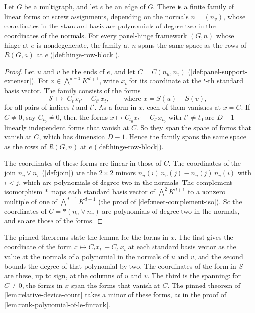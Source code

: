 \begin{lemma}
  \label{lem:rows-polynomial-in-normals}
  \leanok
  Let $G$ be a multigraph, and let $e$ be an edge of $G$. There is a
  finite family of linear forms on screw assignments, depending on the
  normals $n = (n_v)$, whose coordinates in the standard basis are
  polynomials of degree two in the coordinates of the normals. For every
  panel-hinge framework $(G, n)$ whose hinge at $e$ is nondegenerate, the
  family at $n$ spans the same space as the rows of $R(G,n)$ at $e$
  (\cref{def:hinge-row-block}).
\end{lemma}
\begin{proof}
  \leanok
  Let $u$ and $v$ be the ends of $e$, and let $C = C(n_u, n_v)$
  (\cref{def:panel-support-extensor}). For $x \in \bigwedge^{d-1} K^{d+1}$,
  write $x_t$ for its coordinate at the $t$-th standard basis vector. The
  family consists of the forms
  \[
    S \;\mapsto\; C_t\, x_{t'} - C_{t'}\, x_t,
    \qquad \text{where } x = S(u) - S(v),
  \]
  for all pairs of indices $t$ and $t'$. As a form in $x$, each of them
  vanishes at $x = C$. If $C \neq 0$, say $C_{t_0} \neq 0$, then the
  forms $x \mapsto C_{t_0} x_{t'} - C_{t'} x_{t_0}$ with $t' \neq t_0$ are
  $D - 1$ linearly independent forms that vanish at $C$. So they span the
  space of forms that vanish at $C$, which has dimension $D - 1$. Hence
  the family spans the same space as the rows of $R(G,n)$ at $e$
  (\cref{def:hinge-row-block}).

  The coordinates of these forms are linear in those of $C$. The
  coordinates of the join $n_u \vee n_v$ (\cref{def:join}) are the
  $2 \times 2$ minors $n_u(i)\, n_v(j) - n_u(j)\, n_v(i)$ with $i < j$,
  which are polynomials of degree two in the normals. The complement
  isomorphism $*$ maps each standard basis vector of
  $\bigwedge^2 K^{d+1}$ to a nonzero multiple of one of
  $\bigwedge^{d-1} K^{d+1}$ (the proof of
  \cref{def:meet-complement-iso}). So the coordinates of
  $C = *(n_u \vee n_v)$ are polynomials of degree two in the normals, and
  so are those of the forms.
\end{proof}

\begin{fmlnote}
  The pinned theorems state the lemma for the forms in $x$. The first
  gives the coordinate of the form $x \mapsto C_t x_{t'} - C_{t'} x_t$ at
  each standard basis vector as the value at the normals of a polynomial
  in the normals of $u$ and $v$, and the second bounds the degree of that
  polynomial by two. The coordinates of the form in $S$ are these, up to
  sign, at the columns of $u$ and $v$. The third is the spanning: for
  $C \neq 0$, the forms in $x$ span the forms that vanish at $C$. The
  pinned theorem of \cref{lem:relative-device-count} takes a minor of
  these forms, as in the proof of
  \cref{lem:rank-polynomial-of-le-finrank}.
\end{fmlnote}

